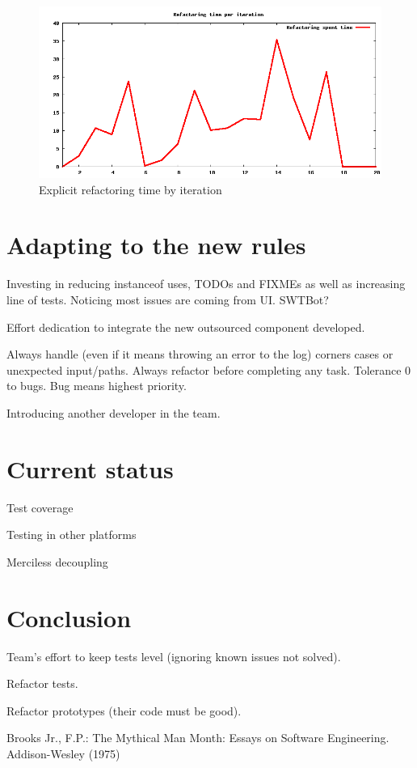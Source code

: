 \documentclass[lnbip]{svmultln}
\begin{document}
\begin{figure}[hbt]
  \centerline{
    \includegraphics[width=120mm]{refactoring.png}
  }
  \caption{Explicit refactoring time by iteration}
  \label{fig:refactoring}
\end{figure}

\section{Adapting to the new rules}
\label{sec:adapting}

Investing in reducing instanceof uses, TODOs and FIXMEs as well as
increasing line of tests. Noticing most issues are coming from
UI. SWTBot?

Effort dedication to integrate the new outsourced component developed.

Always handle (even if it means throwing an error to the log) corners
cases or unexpected input/paths. Always refactor before completing any
task. Tolerance 0 to bugs. Bug means highest priority.

Introducing another developer in the team.

\section{Current status}
\label{sec:nowadays}

Test coverage

Testing in other platforms

Merciless decoupling

\section{Conclusion}
\label{sec:conclusion}

Team's effort to keep tests level (ignoring known issues not solved).

Refactor tests.

Refactor prototypes (their code must be good).



%
%
\begin{thebibliography}{5}

 Brooks Jr., F.P.: The Mythical Man Month: Essays
  on Software Engineering. Addison-Wesley (1975)

\end{thebibliography}
%
\end{document}
